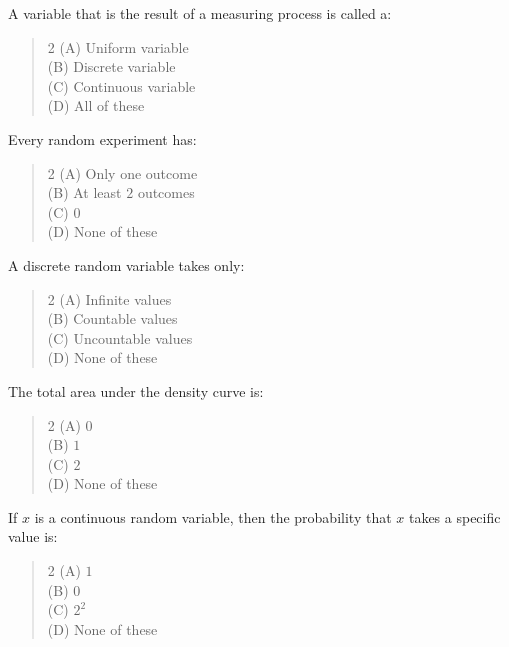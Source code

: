\documentclass[11pt,a4paper]{article}
\begin{document}
\begin{mcqlist}
\item A variable that is the result of a measuring process is called a:
\begin{quote}\begin{multicols}{2}
\noindent (A) Uniform variable \\
(B) Discrete variable \\
(C) Continuous variable \\
(D) All of these
\end{multicols}\end{quote}

\item Every random experiment has:
\begin{quote}\begin{multicols}{2}
\noindent (A) Only one outcome \\
(B) At least $2$ outcomes \\
(C) $0$ \\
(D) None of these
\end{multicols}\end{quote}

\item A discrete random variable takes only:
\begin{quote}\begin{multicols}{2}
\noindent (A) Infinite values \\
(B) Countable values \\
(C) Uncountable values \\
(D) None of these
\end{multicols}\end{quote}

\item The total area under the density curve is:
\begin{quote}\begin{multicols}{2}
\noindent (A) $0$ \\
(B) $1$ \\
(C) $2$ \\
(D) None of these
\end{multicols}\end{quote}

\item If $x$ is a continuous random variable, then the probability that $x$ takes a specific value is:
\begin{quote}\begin{multicols}{2}
\noindent (A) $1$ \\
(B) $0$ \\
(C) $2^2$ \\
(D) None of these
\end{multicols}\end{quote}


\end{mcqlist}
\end{document}
